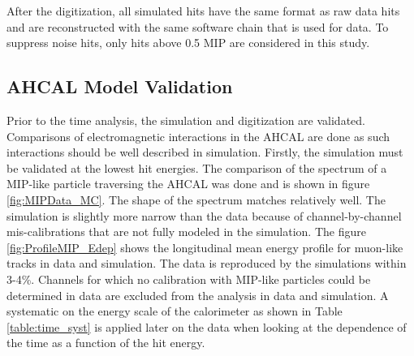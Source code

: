\documentclass{JINST}
\begin{document}
After the digitization, all simulated hits have the same format as raw data hits and are reconstructed with the same software chain that is used for data. To suppress noise hits, only hits above 0.5 MIP are considered in this study.

\subsection{AHCAL Model Validation}

Prior to the time analysis, the simulation and digitization are validated. Comparisons of electromagnetic interactions in the AHCAL are done as such interactions should be well described in simulation. Firstly, the simulation must be validated at the lowest hit energies. The comparison of the spectrum of a MIP-like particle traversing the AHCAL was done and is shown in figure \ref{fig:MIPData_MC}. The shape of the spectrum matches relatively well. The simulation is slightly more narrow than the data because of channel-by-channel mis-calibrations that are not fully modeled in the simulation. The figure \ref{fig:ProfileMIP_Edep} shows the longitudinal mean energy profile for muon-like tracks in data and simulation. The data is reproduced by the simulations within 3-4\%. Channels for which no calibration with MIP-like particles could be determined in data are excluded from the analysis in data and simulation. A systematic on the energy scale of the calorimeter as shown in Table \ref{table:time_syst} is applied later on the data when looking at the dependence of the time as a function of the hit energy.
\end{document}
